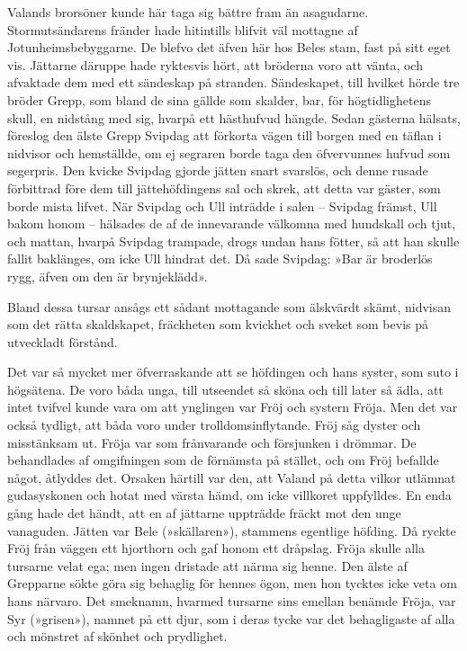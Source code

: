 Valands brorsöner kunde här taga sig bättre fram än asagudarne.
Stormutsändarens fränder hade hitintills blifvit väl mottagne af
Jotunheimsbebyggarne. De blefvo det äfven här hos Beles stam, fast på
sitt eget vis. Jättarne däruppe hade ryktesvis hört, att bröderna voro
att vänta, och afvaktade dem med ett sändeskap på stranden. Sändeskapet,
till hvilket hörde tre bröder Grepp, som bland de sina gällde som
skalder, bar, för högtidlighetens skull, en nidstång med sig, hvarpå ett
hästhufvud hängde. Sedan gästerna hälsats, föreslog den älste Grepp
Svipdag att förkorta vägen till borgen med en täflan i nidvisor och
hemställde, om ej segraren borde taga den öfvervunnes hufvud som
segerpris. Den kvicke Svipdag gjorde jätten snart svarslös, och denne
rusade
förbittrad\protect\hypertarget{lb1625905.xhtmlux5cux23start108}{}{}\protect\hypertarget{lb1625905.xhtmlux5cux23start108-a}{}{}\protect\hypertarget{lb1625905.xhtmlux5cux23start108-b}{}{}\protect\hypertarget{lb1625905.xhtmlux5cux23start108-c}{}{}\protect\hypertarget{lb1625905.xhtmlux5cux23start108-d}{}{}
före dem till jättehöfdingens sal och skrek, att detta var gäster, som
borde mista lifvet. När Svipdag och Ull inträdde i salen -- Svipdag
främst, Ull bakom honom -- hälsades de af de innevarande välkomna med
hundskall och tjut, och mattan, hvarpå Svipdag trampade, drogs undan
hans fötter, så att han skulle fallit baklänges, om icke Ull hindrat
det. Då sade Svipdag: »Bar är broderlös rygg, äfven om den är
brynjeklädd».

Bland dessa tursar ansågs ett sådant mottagande som älskvärdt skämt,
nidvisan som det rätta skaldskapet, fräckheten som kvickhet och sveket
som bevis på utveckladt förstånd.

Det var så mycket mer öfverraskande att se höfdingen och hans syster,
som suto i högsätena. De voro båda unga, till utseendet så sköna och
till later så ädla, att intet tvifvel kunde vara om att ynglingen var
Fröj och systern Fröja. Men det var också tydligt, att båda voro under
trolldomsinflytande. Fröj såg dyster och misstänksam ut. Fröja var som
frånvarande och försjunken i drömmar. De behandlades af omgifningen som
de förnämsta på stället, och om Fröj befallde något, åtlyddes det.
Orsaken härtill var den, att Valand på detta vilkor utlämnat
gudasyskonen och hotat med värsta hämd, om icke villkoret uppfylldes. En
enda gång hade det händt, att en af jättarne uppträdde fräckt mot den
unge vanaguden. Jätten var Bele (»skällaren»), stammens egentlige
höfding. Då ryckte Fröj från väggen ett hjorthorn och gaf honom ett
dråpslag. Fröja skulle alla tursarne velat ega; men ingen dristade att
närma sig henne. Den älste af Grepparne sökte göra sig behaglig för
hennes ögon, men hon tycktes icke veta om hans närvaro. Det smeknamn,
hvarmed tursarne sins emellan benämde Fröja, var Syr (»grisen»), namnet
på ett djur, som i deras tycke var det behagligaste af alla och mönstret
af skönhet och prydlighet.

